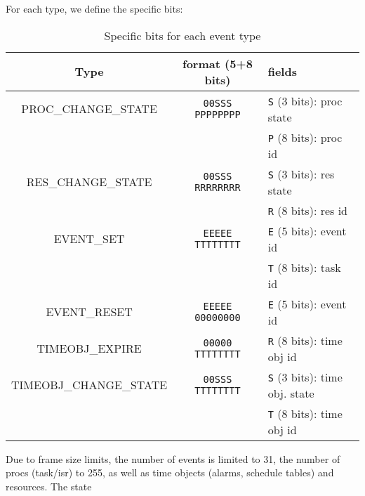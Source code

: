 For each type, we define the specific bits:

\begin{table}[htbp]
	\begin{longtable}[c]{c|c|l}
		\bf Type & \bf format (5+8 bits) & \bf fields \\ \hline
		PROC\_CHANGE\_STATE    & \texttt{00SSS PPPPPPPP}& \texttt{S} (3 bits): proc state \\
		                       &                        & \texttt{P} (8 bits): proc id    \\ \hline
		RES\_CHANGE\_STATE     & \texttt{00SSS RRRRRRRR}& \texttt{S} (3 bits): res state  \\
		                       &                        & \texttt{R} (8 bits): res id     \\ \hline
		EVENT\_SET             & \texttt{EEEEE TTTTTTTT}& \texttt{E} (5 bits): event id   \\
		                       &                        & \texttt{T} (8 bits): task id     \\ \hline
		EVENT\_RESET           & \texttt{EEEEE 00000000}& \texttt{E} (5 bits): event id   \\ \hline
		TIMEOBJ\_EXPIRE        & \texttt{00000 TTTTTTTT}& \texttt{R} (8 bits): time obj id    \\ \hline
		TIMEOBJ\_CHANGE\_STATE & \texttt{00SSS TTTTTTTT}& \texttt{S} (3 bits): time obj. state \\
		                       &                        & \texttt{T} (8 bits): time obj id    \\ \hline
	\end{longtable}
	\caption{Specific bits for each event type}
	\label{tab:traceBin}
\end{table}

Due to frame size limits, the number of events is limited to 31, the number of procs (task/isr) to 255, as well as time objects (alarms, schedule tables) and resources.
The state 


